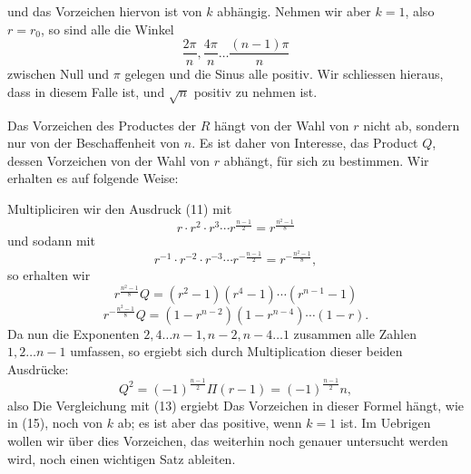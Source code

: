 
und das Vorzeichen hiervon ist von $k$ abhängig. Nehmen wir aber $k = 1$, also $r = r_0$, so sind alle die Winkel
\[
\frac{2\pi}{n}, \frac{4\pi}{n} \ldots \frac{(n-1)\pi}{n}
\]
zwischen Null und $\pi$ gelegen und die Sinus alle positiv. Wir schliessen hieraus, dass in diesem Falle
ist, und $\sqrt{n}$ positiv zu nehmen ist.

Das Vorzeichen des Productes der $R$ hängt von der Wahl von $r$ nicht ab, sondern nur von der Beschaffenheit von $n$. Es ist daher von Interesse, das Product $Q$, dessen Vorzeichen von der Wahl von $r$ abhängt, für sich zu bestimmen. Wir erhalten es auf folgende Weise:

Multipliciren wir den Ausdruck (11) mit
\[
r \cdot r^2 \cdot r^3 \cdots r^{\frac{n-1}{2}} = r^{\frac{n^2-1}{8}}
\]
und sodann mit
\[
r^{-1} \cdot r^{-2} \cdot r^{-3} \cdots r^{-\frac{n-1}{2}} = r^{-\frac{n^2-1}{8}},
\]
so erhalten wir
\[
r^{\frac{n^2-1}{8}} Q = (r^2 - 1)(r^4 - 1) \cdots (r^{n-1} - 1)
\]
\[
r^{-\frac{n^2-1}{8}} Q = (1 - r^{n-2})(1 - r^{n-4}) \cdots (1 - r).
\]
Da nun die Exponenten $2, 4 \ldots n-1, n-2, n-4 \ldots 1$ zusammen alle Zahlen $1, 2 \ldots n-1$ umfassen, so ergiebt sich durch Multiplication dieser beiden Ausdrücke:
\[
Q^2 = (-1)^{\frac{n-1}{2}} \Pi(r-1) = (-1)^{\frac{n-1}{2}} n,
\]
also
Die Vergleichung mit (13) ergiebt
Das Vorzeichen in dieser Formel hängt, wie in (15), noch von $k$ ab; es ist aber das positive, wenn $k = 1$ ist. Im Uebrigen wollen wir über dies Vorzeichen, das weiterhin noch genauer untersucht werden wird, noch einen wichtigen Satz ableiten.
